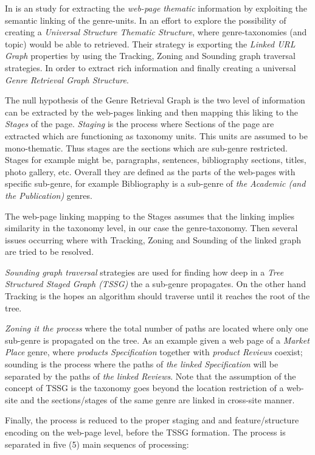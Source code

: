 In \parencite{mehler2011integrating} is an study for extracting the \textit{web-page thematic} information by exploiting the semantic linking of the genre-units. In an effort to explore the possibility of creating a \textit{Universal Structure Thematic Structure}, where genre-taxonomies (and topic) would be able to retrieved. Their strategy is exporting the \textit{Linked URL Graph} properties by using the Tracking, Zoning and Sounding graph traversal strategies. In order to extract rich information and finally creating a universal \textit{Genre Retrieval Graph Structure}.

The null hypothesis of the Genre Retrieval Graph is the two level of information can be extracted by the web-pages linking and then mapping this liking to the \textit{Stages} of the page. \textit{Staging} is the process where Sections of the page are extracted which are functioning as taxonomy units. This units are assumed to be mono-thematic. Thus stages are the sections which are sub-genre restricted. Stages for example might be, paragraphs, sentences, bibliography sections, titles, photo gallery, etc. Overall they are defined as the parts of the web-pages with specific sub-genre, for example Bibliography is a sub-genre of \textit{the Academic (and the Publication)} genres.

The web-page linking mapping to the Stages assumes that the linking implies similarity in the taxonomy level, in our case the genre-taxonomy. Then several issues occurring where with Tracking, Zoning and Sounding of the linked graph are tried to be resolved.

\textit{Sounding graph traversal} strategies are used for finding how deep in a \textit{Tree Structured Staged Graph (TSSG)}  the a sub-genre propagates. On the other hand Tracking is the hopes an algorithm should traverse until it reaches the root of the tree.

\textit{Zoning it the process} where the total number of paths are located where only one sub-genre is propagated on the tree. As an example given a web page of a \textit{Market Place} genre, where \textit{products Specification} together with \textit{product Reviews} coexist; sounding is the process where the paths of \textit{the linked Specification} will be separated by the paths of \textit{the linked Reviews}. Note that the assumption of the concept of TSSG is the taxonomy goes beyond the location restriction of a web-site and the sections/stages of the same genre are linked in cross-site manner.

Finally, the process is reduced to the proper staging and and feature/structure encoding on the web-page level, before the TSSG formation. The process is separated in five (5) main sequencs of processing:

